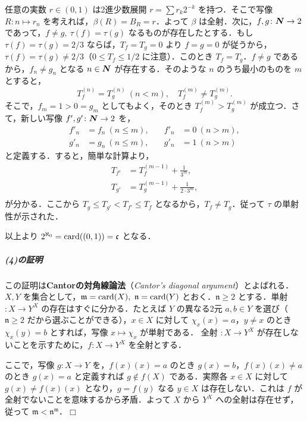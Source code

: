 \documentclass[pandoc,base=10pt,b5j,precisetext]{bxjsarticle}
\let\oldsubparagraph\subparagraph
\renewcommand{\subparagraph}[1]{\oldsubparagraph{#1}\mbox{}}
\def\lt{<}
\def\gt{>}
\begin{document}
任意の実数 \(r \in (0, 1)\) は2進少数展開 \(r = \sum r_k 2^{-k}\)
を持つ．そこで写像 \(R \colon n \mapsto r_n\)
を考えれば，\(\beta(R) = B_R = r\)．よって \(\beta\)
は全射．次に，\(f, g \colon \boldsymbol{N} \to 2\)
であって，\(f \neq g,\ \tau(f) = \tau(g)\)
なるものが存在したとする．もし \(\tau(f) = \tau(g) = 2/3\)
ならば，\(T_f = T_g = 0\) より \(f = g = 0\)
が従うから，\(\tau(f) = \tau(g) \neq 2/3\)（\(0 \le T_f \le 1/2\)
に注意）．このとき \(T_f = T_g\)．\(f \neq g\)
であるから，\(f_n \neq g_n\) となる \(n \in \boldsymbol{N}\)
が存在する．そのような \(n\) のうち最小のものを \(m\) とすると， \[
T_f^{(n)} = T_g^{(n)} \ (n \lt m), \quad T_f^{(m)} \neq T_g^{(m)}.
\] そこで，\(f_m = 1 \gt 0 = g_m\) としてもよく，そのとき
\(T_f^{(m)} \gt T_g^{(m)}\) が成立つ．さて，新しい写像
\(f', g' \colon \boldsymbol{N} \to 2\) を， \begin{align*}
f'_n &= f_n \ (n \le m), &\quad f'_n &= 0 \ (n \gt m),\\
g'_n &= g_n \ (n \le m), &\quad g'_n &= 1 \ (n \gt m)
\end{align*} と定義する．すると，簡単な計算より， \begin{align*}
T_{f'} &= T_f^{(m - 1)} + \frac 1{3^m},\\
T_{g'} &= T_g^{(m - 1)} + \frac 1{2 \cdot 3^m},\\
\end{align*} が分かる．ここから \(T_g \le T_{g'} \lt T_{f'} \le T_f\)
となるから，\(T_f \neq T_g\)．従って \(\tau\) の単射性が示された．

以上より \(2^{\aleph_0} = \mathop{\mathrm{card}}\nolimits((0, 1)) = \mathfrak c\) となる．

\hypertarget{ux306eux8a3cux660e-3}{%
\subparagraph{(4)の証明}\label{ux306eux8a3cux660e-3}}

この証明は\textbf{Cantorの対角線論法}（\emph{Cantor's diagonal
argument}）とよばれる．\(X, Y\)
を集合として，\(\mathfrak m = \card(X),\ \mathfrak n = \card(Y)\)
とおく．\(\mathfrak n \ge 2\) とする．単射 \(\colon X \to Y^X\)
の存在はすぐに分かる．たとえば \(Y\) の異なる2元 \(a, b \in Y\)
を選び（\(\mathfrak n \ge 2\) だから選ぶことができる），\(x \in X\)
に対して \(\chi_x(x) = a\)，\(y \neq x\) のとき \(\chi_x(y) = b\)
とすれば，写像 \(x \mapsto \chi_x\) が単射である． 全射
\(\colon X \to Y^X\)
が存在しないことを示すために，\(f \colon X \to Y^X\) を全射とする．

ここで，写像 \(g \colon X \to Y\) を，\(f(x)(x) = a\) のとき
\(g(x) = b\)，\(f(x)(x) \neq a\) のとき \(g(x) = a\) と定義すれば
\(g \notin f(X)\) である．実際各 \(x \in X\) に対して
\(g(x) \neq f(x)(x)\) となり，\(g = f(y)\) なる \(y \in X\)
は存在しない．これは \(f\) が全射でないことを意味するから矛盾．よって
\(X\) から \(Y^X\) への全射は存在せず，従って
\(\mathfrak m \lt \mathfrak n^{\mathfrak m}\)．\(\Box\)
\end{document}
